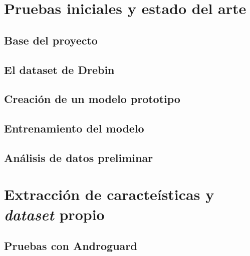 

\section{Pruebas iniciales y estado del arte}

\subsection{Base del proyecto}

\subsection{El dataset de Drebin}

\subsection{Creación de un modelo prototipo}

\subsection{Entrenamiento del modelo}

\subsection{Análisis de datos preliminar}



\section{Extracción de caracteísticas y \textit{dataset} propio}

\subsection{Pruebas con Androguard}

